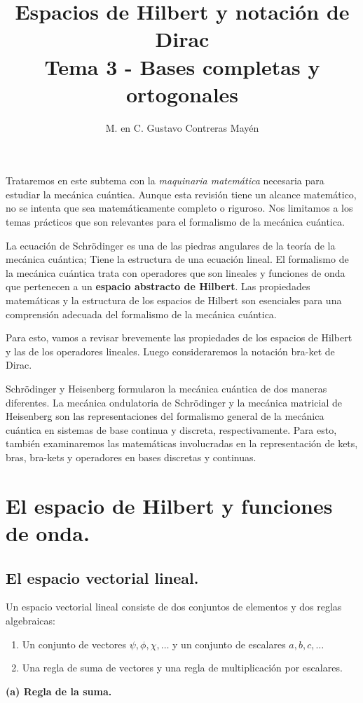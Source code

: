 
\usepackage{apacite}
\title{Espacios de Hilbert y notación de Dirac \\ \large {Tema 3 - Bases completas y ortogonales}  \vspace{-3ex}}
\author{M. en C. Gustavo Contreras Mayén}
\date{ }

\vspace{-4cm}
\maketitle
\fontsize{14}{14}\selectfont
\tableofcontents
\newpage
Trataremos en este subtema con la \emph{maquinaria matemática} necesaria para estudiar la mecánica cuántica. Aunque esta revisión tiene un alcance matemático, no se intenta que sea matemáticamente completo o riguroso. Nos limitamos a los temas prácticos que son relevantes para el formalismo de la mecánica cuántica.
\par
La ecuación de Schrödinger es una de las piedras angulares de la teoría de la mecánica cuántica; Tiene la estructura de una ecuación lineal. El formalismo de la mecánica cuántica trata con operadores que son lineales y funciones de onda que pertenecen a un \textbf{espacio abstracto de Hilbert}. Las propiedades matemáticas y la estructura de los espacios de Hilbert son esenciales para una comprensión adecuada del formalismo de la mecánica cuántica.
\par
Para esto, vamos a revisar brevemente las propiedades de los espacios de Hilbert y las de los operadores lineales. Luego consideraremos la notación bra-ket de Dirac.
\par
Schrödinger y Heisenberg formularon la mecánica cuántica de dos maneras diferentes. La mecánica ondulatoria de Schrödinger y la mecánica matricial de Heisenberg son las representaciones del formalismo general de la mecánica cuántica en sistemas de base continua y discreta, respectivamente. Para esto, también examinaremos las matemáticas involucradas en la representación de kets, bras, bra-kets y operadores en bases discretas y continuas.
\section{El espacio de Hilbert y funciones de onda.}
\subsection{El espacio vectorial lineal.}
Un espacio vectorial lineal consiste de dos conjuntos de elementos y dos reglas algebraicas:
\begin{enumerate}
\item Un conjunto de vectores $\psi, \phi, \chi, \ldots$ y un conjunto de escalares $a, b, c, \ldots$
\item Una regla de suma de vectores y una regla de multiplicación por escalares.
\end{enumerate}
\textbf{(a) Regla de la suma.}


